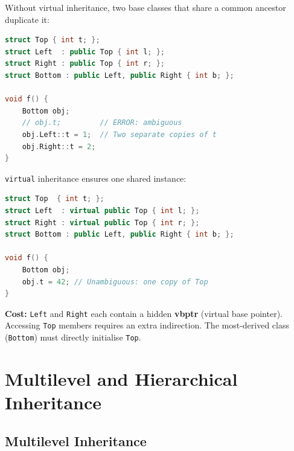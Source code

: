 Without virtual inheritance, two base classes that share a common ancestor duplicate it:

\begin{lstlisting}[language=C++, caption={Diamond problem --- ambiguous Top::t}]
struct Top { int t; };
struct Left  : public Top { int l; };
struct Right : public Top { int r; };
struct Bottom : public Left, public Right { int b; };

void f() {
    Bottom obj;
    // obj.t;         // ERROR: ambiguous
    obj.Left::t = 1;  // Two separate copies of t
    obj.Right::t = 2;
}
\end{lstlisting}

\texttt{virtual} inheritance ensures one shared instance:

\begin{lstlisting}[language=C++, caption={Virtual inheritance resolves the diamond}]
struct Top  { int t; };
struct Left  : virtual public Top { int l; };
struct Right : virtual public Top { int r; };
struct Bottom : public Left, public Right { int b; };

void f() {
    Bottom obj;
    obj.t = 42; // Unambiguous: one copy of Top
}
\end{lstlisting}

\textbf{Cost:} \texttt{Left} and \texttt{Right} each contain a hidden \textbf{vbptr} (virtual base pointer). Accessing \texttt{Top} members requires an extra indirection. The most-derived class (\texttt{Bottom}) must directly initialise \texttt{Top}.

\section{Multilevel and Hierarchical Inheritance}
\label{sec:inheritance-types}

\subsection{Multilevel Inheritance}

